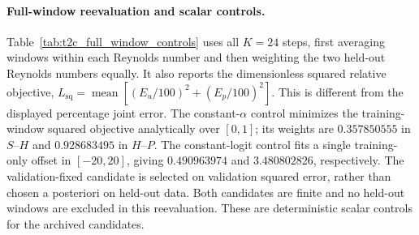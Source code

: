 \documentclass{article}
\begin{document}
\par


\paragraph{Full-window reevaluation and scalar controls.}
Table~\ref{tab:t2c_full_window_controls} uses all $K=24$ steps, first
averaging windows within each Reynolds number and then weighting the
two held-out Reynolds numbers equally. It also reports the dimensionless
squared relative objective, $L_{\mathrm{sq}}=\operatorname{mean}
[(E_u/100)^2+(E_p/100)^2]$. This is different from the displayed
percentage joint error. The constant-$\alpha$ control minimizes the
training-window squared objective analytically over $[0,1]$; its weights
are $0.357850555$ in $S$--$H$ and $0.928683495$ in $H$--$P$.
The constant-logit control fits a single training-only offset in
$[-20,20]$, giving $0.490963974$ and $3.480802826$, respectively.
The validation-fixed candidate is selected on validation squared error,
rather than chosen a posteriori on held-out data. Both candidates are
finite and no held-out windows are excluded in this reevaluation.
These are deterministic scalar controls for the archived candidates.
\end{document}
